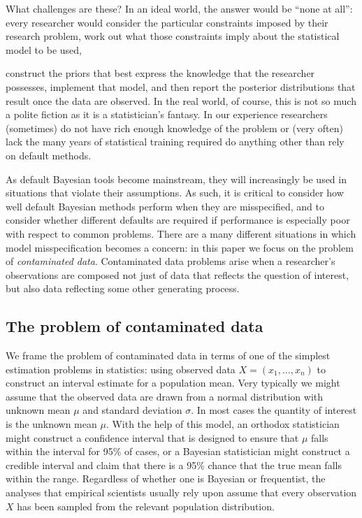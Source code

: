 \documentclass[doc]{apa6}
\begin{document}
What challenges are these? In an ideal world, the answer would be ``none at all'': every researcher would consider the particular constraints imposed by their research problem, work out what those constraints imply about the statistical model to be used, {construct the priors that best express the knowledge that the researcher possesses, implement that model, and then report the posterior distributions that result once the data are observed. In the real world, of course, this is not so much a polite fiction as it is a statistician's fantasy. In our experience researchers (sometimes) do not have rich enough knowledge of the problem or (very often) lack the many years of statistical training required do anything other than rely on default methods.

As default Bayesian tools become mainstream, they will increasingly be used in situations that violate their assumptions. As such, it is critical to consider how well default Bayesian methods perform when they are misspecified, and to consider whether different defaults are required if performance is especially poor with respect to common problems. There are a many different situations in which model misspecification becomes a concern: in this paper we focus on the problem of \textit{contaminated data}. Contaminated data problems arise when a researcher's observations are composed not just of data that reflects the question of interest, but also data reflecting some other generating process.


\subsection{The problem of contaminated data}

We frame the problem of contaminated data in terms of one of the simplest estimation problems in statistics: using observed data $X=(x_1,\ldots,x_n)$ to construct an interval estimate for a population mean. Very typically we might assume that the observed data are drawn from a normal distribution with unknown mean $\mu$ and standard deviation $\sigma$. In most cases the quantity of interest is the unknown mean $\mu$. With the help of this model, an orthodox statistician might construct a confidence interval that is designed to ensure that $\mu$ falls within the interval for 95\% of cases, or a Bayesian statistician might construct a credible interval and claim that there is a 95\% chance that the true mean falls within the range. Regardless of whether one is Bayesian or frequentist, the analyses that empirical scientists usually rely upon assume that every observation $X$ has been sampled from the relevant population distribution.

}
\end{document}
